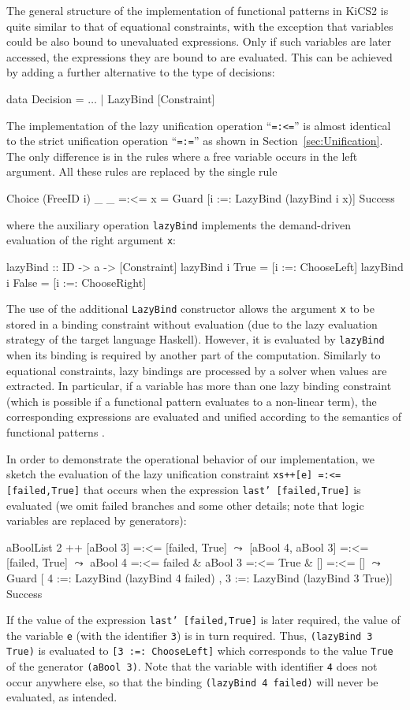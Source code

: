 \documentclass{llncs}
\newcommand{\code}[1]{\mbox{\small\texttt{#1}}}
\newcommand{\ccode}[1]{``\code{#1}''}
\begin{document}
The general structure of the implementation of functional patterns in KiCS2
is quite similar to that of equational constraints,
with the exception that variables could be also bound
to unevaluated expressions. 
Only if such variables are later
accessed, the expressions they are bound to are evaluated.
This can be achieved by adding a further alternative
to the type of decisions:
\begin{haskell}
  data Decision = $\ldots$ | LazyBind [Constraint]
\end{haskell}
%
The implementation of the lazy unification operation \ccode{=:<=}
is almost identical to the strict unification operation \ccode{=:=}
as shown in Section~\ref{sec:Unification}.
The only difference is in the rules where a free variable occurs
in the left argument. All these rules are replaced by the single
rule
\begin{haskell}
  Choice (FreeID i) _ _ =:<= x
    = Guard [i :=: LazyBind (lazyBind i x)] Success
\end{haskell}
where the auxiliary operation \code{lazyBind}
implements the demand-driven evaluation of the right argument \code{x}:
\begin{haskell}
  lazyBind :: ID -> a -> [Constraint]
  lazyBind i True  = [i :=: ChooseLeft]
  lazyBind i False = [i :=: ChooseRight]
\end{haskell}
The use of the additional \code{LazyBind} constructor allows the argument 
\code{x} to be stored in a binding constraint without evaluation 
(due to the lazy evaluation strategy of the
target language Haskell).
However, it is evaluated by \code{lazyBind} when its binding
is required by another part of the computation.
Similarly to equational constraints,
lazy bindings are processed by a solver when values are extracted.
In particular, if a variable has more than one lazy binding constraint
(which is possible if a functional pattern evaluates to a non-linear term),
the corresponding expressions are evaluated and unified
according to the semantics of functional patterns
\cite{AntoyHanus05LOPSTR}.

In order to demonstrate the operational behavior of our implementation,
we sketch the evaluation of the lazy unification constraint
\code{xs++[e] =:<= [failed,True]} that occurs when the expression
\code{last' [failed,True]} is evaluated (we omit failed branches
and some other details; note that logic variables are replaced
by generators):
\begin{haskell}
     aBoolList 2 ++ [aBool 3] =:<= [failed, True]
  $\leadsto$ [aBool 4, aBool 3] =:<= [failed, True]
  $\leadsto$ aBool 4 =:<= failed & aBool 3 =:<= True & [] =:<= []
  $\leadsto$ Guard [ 4 :=: LazyBind (lazyBind 4 failed)
           , 3 :=: LazyBind (lazyBind 3 True)] Success
\end{haskell}
If the value of the expression \code{last' [failed,True]} is later required,
the value of the variable \code{e} (with the identifier \code{3}) is in turn
required.
Thus, \code{(lazyBind 3 True)} is evaluated to \code{[3 :=: ChooseLeft]}
which corresponds to the value \code{True} of the generator \code{(aBool 3)}.
Note that the variable with identifier \code{4} does not occur
anywhere else, so that the binding \code{(lazyBind 4 failed)}
will never be evaluated, as intended.
\end{document}
